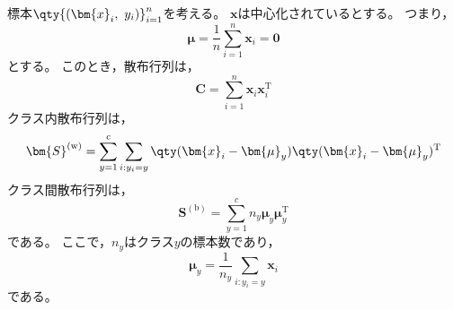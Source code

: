 \documentclass[class=jsarticle, crop=false, dvipdfmx, fleqn]{standalone}
\begin{document}
\section{}

標本\(\qty{(\bm{x}_i,\ y_i)}_{i=1}^{n}\)を考える。
\(\bm{x}\)は中心化されているとする。
つまり，
\begin{equation}
    \bm{\mu} = \frac{1}{n} \sum_{i=1}^{n} \bm{x}_i = \bm{0}
    \label{eq:centering}
\end{equation}
とする。
このとき，散布行列は，
\begin{equation}
    \bm{C} = \sum_{i=1}^{n} \bm{x}_i \bm{x}_i^\mathrm{T}
    \label{eq:scattering_matrix}
\end{equation}
クラス内散布行列は，
\begin{equation}
    \bm{S}^\mathrm{(w)} = \sum_{y=1}^{c} \sum_{i: y_i=y} \qty(\bm{x}_i - \bm{\mu}_y) \qty(\bm{x}_i - \bm{\mu}_y)^\mathrm{T}
    \label{eq:within_class_scattering_matrix}
\end{equation}
クラス間散布行列は，
\begin{equation}
    \bm{S}^\mathrm{(b)} = \sum_{y=1}^{c} n_y \bm{\mu}_y \bm{\mu}_y^\mathrm{T}
    \label{eq:between_class_scattering_matrix}
\end{equation}
である。
ここで，\(n_y\)はクラス\(y\)の標本数であり，
\begin{equation}
    \bm{\mu}_y = \frac{1}{n_y} \sum_{i: y_i=y} \bm{x}_i
    \label{eq:mean_y}
\end{equation}
である。
\end{document}
